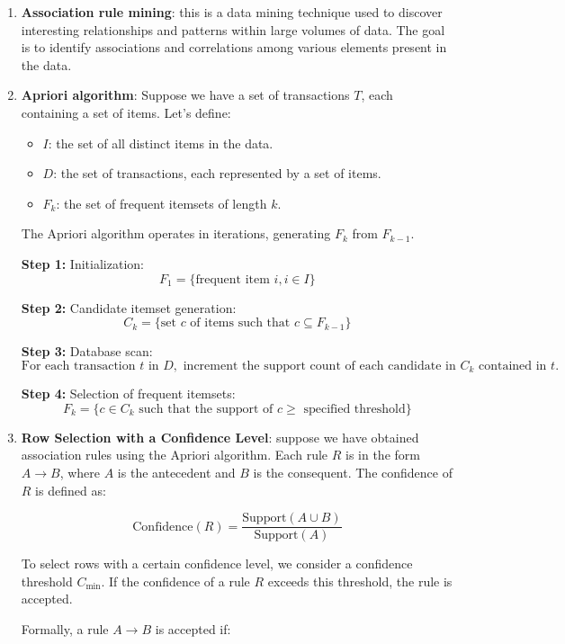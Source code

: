 \documentclass[12pt,a4paper,openright,twoside]{book}
\begin{document}
\begin{enumerate}
    \item \textbf{Association rule mining}: this is a data mining technique used to discover interesting relationships and patterns within large volumes of data. The goal is to identify associations and correlations among various elements present in the data.

    \item \textbf{Apriori algorithm}: Suppose we have a set of transactions $T$, each containing a set of items. Let's define:

\begin{itemize}
  \item $I$: the set of all distinct items in the data.
  \item $D$: the set of transactions, each represented by a set of items.
  \item $F_k$: the set of frequent itemsets of length $k$.
\end{itemize}

The Apriori algorithm operates in iterations, generating $F_k$ from $F_{k-1}$.

\textbf{Step 1:} Initialization:
$$F_1 = \{ \text{frequent item } i, i \in I \}$$

\textbf{Step 2:} Candidate itemset generation:
$$C_k = \{ \text{set } c \text{ of items such that } c \subseteq F_{k-1} \}$$

\textbf{Step 3:} Database scan:
$$\text{For each transaction } t \text{ in } D, \text{ increment the support count of each candidate in } C_k \text{ contained in } t.$$

\textbf{Step 4:} Selection of frequent itemsets:
$$F_k = \{ c \in C_k \text{ such that the support of } c \geq \text{ specified threshold} \}$$

\item \textbf{Row Selection with a Confidence Level}: 
suppose we have obtained association rules using the Apriori algorithm. Each rule $R$ is in the form $A \rightarrow B$, where $A$ is the antecedent and $B$ is the consequent. The confidence of $R$ is defined as:

\[
\text{Confidence}(R) = \frac{\text{Support}(A \cup B)}{\text{Support}(A)}
\]

To select rows with a certain confidence level, we consider a confidence threshold $C_{\text{min}}$. If the confidence of a rule $R$ exceeds this threshold, the rule is accepted.

Formally, a rule $A \rightarrow B$ is accepted if:


\end{enumerate}
\end{document}
